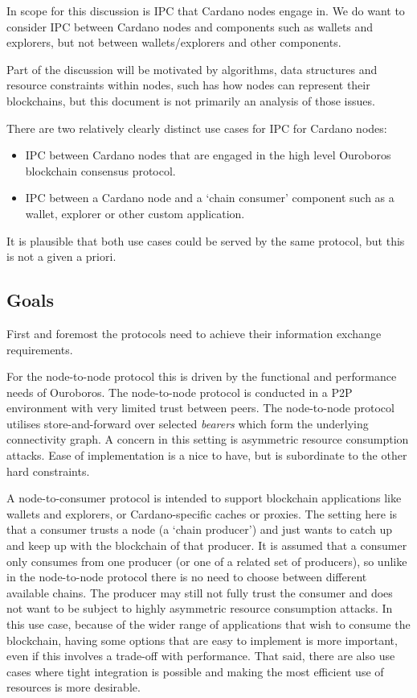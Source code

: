 \documentclass{article}
\theoremstyle{definition}{
  \newtheorem{lemma}{Lemma}[section] %
  \newtheorem{definition}[lemma]{Definition}
}
\theoremstyle{theorem}{
  \newtheorem{invariant}[lemma]{Invariant}
  \newtheorem{proofobligation}[lemma]{Proof Obligation}
}
\numberwithin{equation}{lemma}
\begin{document}
In scope for this discussion is IPC that Cardano nodes engage in. We do want
to consider IPC between Cardano nodes and components such as wallets and
explorers, but not between wallets/explorers and other components.

Part of the discussion will be motivated by algorithms, data structures and
resource constraints within nodes, such has how nodes can represent their
blockchains, but this document is not primarily an analysis of those issues.

There are two relatively clearly distinct use cases for IPC for Cardano nodes:
\begin{itemize}
\item IPC between Cardano nodes that are engaged in the high level Ouroboros
      blockchain consensus protocol.
\item IPC between a Cardano node and a `chain consumer' component such as a
      wallet, explorer or other custom application.
\end{itemize}

It is plausible that both use cases could be served by the same protocol, but
this is not a given a priori.

\subsection{Goals}

First and foremost the protocols need to achieve their information exchange
requirements.

For the node-to-node protocol this is driven by the functional and performance
needs of Ouroboros. The node-to-node protocol is conducted in a P2P environment
with very limited trust between peers. The node-to-node protocol utilises
store-and-forward over selected \emph{bearers} which form the underlying
connectivity graph. A concern in this setting is asymmetric resource consumption
attacks. Ease of implementation is a nice to have, but is subordinate to the
other hard constraints.

A node-to-consumer protocol is intended to support blockchain applications
like wallets and explorers, or Cardano-specific caches or proxies. The setting
here is that a consumer trusts a node (a `chain producer') and just wants to
catch up and keep up with the blockchain of that producer. It is assumed that
a consumer only consumes from one producer (or one of a related set of
producers), so unlike in the node-to-node protocol there is no need to choose
between different available chains. The producer may still not fully trust the
consumer and does not want to be subject to highly asymmetric resource
consumption attacks. In this use case, because of the wider range of
applications that wish to consume the blockchain, having some options that are
easy to implement is more important, even if this involves a trade-off with
performance. That said, there are also use cases where tight integration is
possible and making the most efficient use of resources is more desirable.
\end{document}
